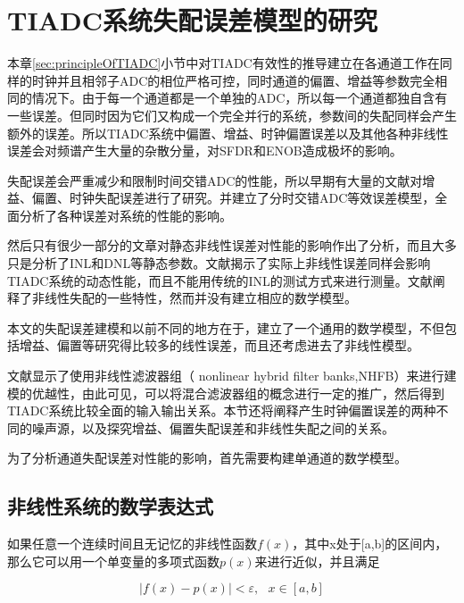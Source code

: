 
\chapter{TIADC系统失配误差模型的研究}
		
	本章\ref{sec:principleOfTIADC}小节中对TIADC有效性的推导建立在各通道工作在同样的时钟并且相邻子ADC的相位严格可控，同时通道的偏置、增益等参数完全相同的情况下。由于每一个通道都是一个单独的ADC，所以每一个通道都独自含有一些误差。但同时因为它们又构成一个完全并行的系统，参数间的失配同样会产生额外的误差。所以TIADC系统中偏置、增益、时钟偏置误差以及其他各种非线性误差会对频谱产生大量的杂散分量，对SFDR和ENOB造成极坏的影响。\par
	失配误差会严重减少和限制时间交错ADC的性能，所以早期有大量的文献对增益、偏置、时钟失配误差进行了研究。并建立了分时交错ADC等效误差模型，全面分析了各种误差对系统的性能的影响。\par
	然后只有很少一部分的文章对静态非线性误差对性能的影响作出了分析，而且大多只是分析了INL和DNL等静态参数。文献\cite{simoes1997nonlinearity}揭示了实际上非线性误差同样会影响TIADC系统的动态性能，而且不能用传统的INL的测试方式来进行测量。文献\cite{kurosawa2002channel}阐释了非线性失配的一些特性，然而并没有建立相应的数学模型。\par
	本文的失配误差建模和以前不同的地方在于，建立了一个通用的数学模型，不但包括增益、偏置等研究得比较多的线性误差，而且还考虑进去了非线性模型。\par
	文献\cite{vogel2004analysis}显示了使用非线性滤波器组（ nonlinear hybrid filter banks,NHFB）来进行建模的优越性，由此可见，可以将混合滤波器组的概念进行一定的推广，然后得到TIADC系统比较全面的输入输出关系。本节还将阐释产生时钟偏置误差的两种不同的噪声源，以及探究增益、偏置失配误差和非线性失配之间的关系。\par	
	为了分析通道失配误差对性能的影响，首先需要构建单通道的数学模型。\par
	\section{非线性系统的数学表达式}\label{sec:nonlinearTheory}		
		
		如果任意一个连续时间且无记忆的非线性函数$f(x)$，其中x处于[a,b]的区间内，那么它可以用一个单变量的多项式函数$p(x)$来进行近似，并且满足

			\begin{equation}
				\left| {f\left( x \right) - p\left( x \right)} \right| < \varepsilon ,\,\,\,\,x \in \left[ {a,b} \right]
			\end{equation}
			
